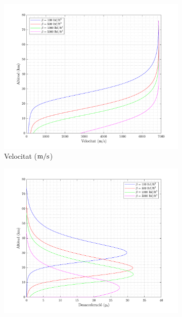 \begin{figure}[ht]
    \centering
    \begin{subfigure}[t]{.33\textwidth}
        \centering
        \includegraphics[width=\linewidth]{imagenes/01_ballistic_graficas/velocitat_no_title.pdf}
        \captionsetup{skip=0pt}
        \caption{Velocitat ($\meter/\second$)}
    \end{subfigure}%
    \begin{subfigure}[t]{.33\textwidth}
        \centering
        \includegraphics[width=\linewidth]{imagenes/01_ballistic_graficas/desacceleracio_no_title.pdf}

\end{subfigure}
\end{figure}
